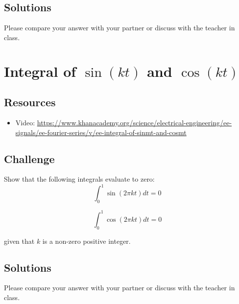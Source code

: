 \subsection*{Solutions}
Please compare your answer with your partner or discuss with the teacher in class.




\newpage
\section{Integral of $\sin(kt)$ and $\cos(kt)$}

\subsection*{Resources}
\begin{itemize}
    \item Video: \url{https://www.khanacademy.org/science/electrical-engineering/ee-signals/ee-fourier-series/v/ee-integral-of-sinmt-and-cosmt}
\end{itemize}

\subsection*{Challenge}
Show that the following integrals evaluate to zero:
\begin{equation}
    \int_0^1 \sin(2 \pi k t) dt = 0
\end{equation}

\begin{equation}
    \int_0^1 \cos(2 \pi k t) dt = 0
\end{equation}

given that $k$ is a non-zero positive integer.

\subsection*{Solutions}
Please compare your answer with your partner or discuss with the teacher in class.




